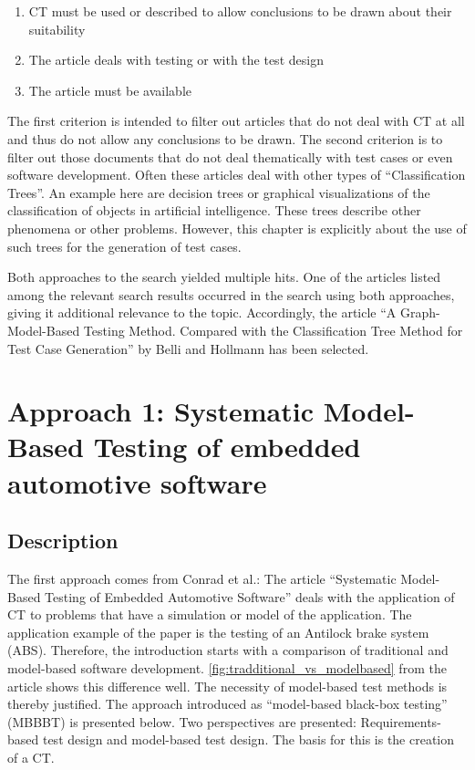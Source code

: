 \begin{enumerate}
\item CT must be used or described to allow conclusions to be drawn about their suitability
\item The article deals with testing or with the test design
\item The article must be available
\end{enumerate}

The first criterion is intended to filter out articles that do not deal with CT at all and thus do not allow any conclusions to be drawn. The second criterion is to filter out those documents that do not deal thematically with test cases or even software development. Often these articles deal with other types of \enquote{Classification Trees}. An example here are decision trees or graphical visualizations of the classification of objects in artificial intelligence. These trees describe other phenomena or  other problems. However, this chapter is explicitly about the use of such trees for the generation of test cases.

Both approaches to the search yielded multiple hits. One of the articles listed among the relevant search results occurred in the search using both approaches, giving it additional relevance to the topic. Accordingly, the article \enquote{A Graph-Model-Based Testing Method. Compared with the Classification Tree Method for Test Case Generation} by Belli and Hollmann\cite{Belli2009} has been selected.

\pagebreak

\section{Approach 1: Systematic Model-Based Testing of embedded automotive software}
\label{Kap:Approach1}

\subsection{Description}

The first approach comes from Conrad et al.\cite{Conrad2005}: The article \enquote{Systematic Model-Based Testing of Embedded Automotive Software} deals with the application of CT to problems that have a simulation or model of the application. The application example of the paper is the testing of an Antilock brake system (ABS). Therefore, the introduction starts with a comparison of traditional and model-based software development. \autoref{fig:tradditional_vs_modelbased} from the article shows this difference well. The necessity of model-based test methods is thereby justified. The approach introduced as \enquote{model-based black-box testing} (MBBBT) is presented below. Two perspectives are presented: Requirements-based test design and model-based test design. The basis for this is the creation of a CT.

